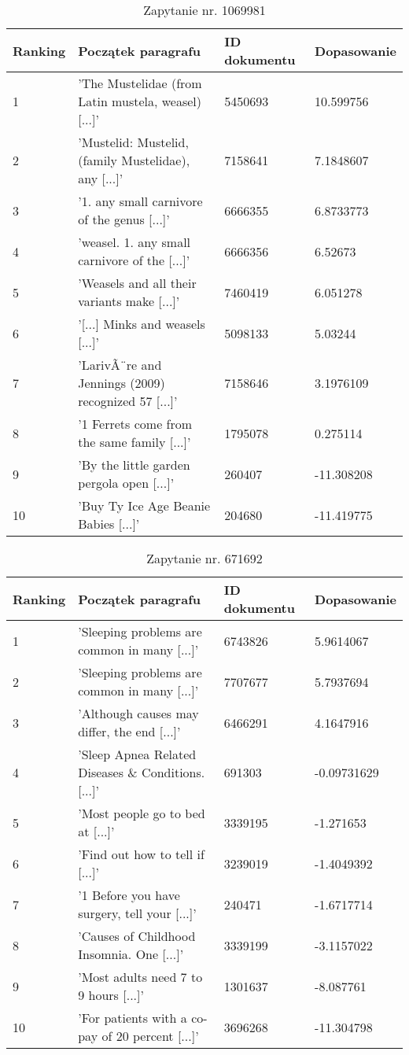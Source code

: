 \begin{table}[htp!]
\centering
\caption{Zapytanie nr. 1069981}
\vspace*{5mm}
\begin{tabular}{llll}
   Ranking & Początek paragrafu & ID dokumentu & Dopasowanie \\
   \hline
    1 & 'The Mustelidae (from Latin mustela, weasel) [...]' & 5450693 & 10.599756 \\
    2 & 'Mustelid: Mustelid, (family Mustelidae), any [...]' & 7158641 &  7.1848607 \\
    3 & '1. any small carnivore of the genus [...]' & 6666355 & 6.8733773 \\
    4 & 'weasel. 1. any small carnivore of the [...]' & 6666356 &  6.52673 \\
    5 & 'Weasels and all their variants make [...]' & 7460419 &  6.051278\\
    6 & '[...] Minks and weasels  [...]' & 5098133 & 5.03244 \\
    7 & 'LarivÃ¨re and Jennings (2009) recognized 57 [...]' & 7158646 & 3.1976109 \\
    8 & '1 Ferrets come from the same family [...]' & 1795078 &  0.275114 \\
    9 & 'By the little garden pergola open [...]' & 260407 &  -11.308208 \\
    10 & 'Buy Ty Ice Age Beanie Babies [...]' & 204680 & -11.419775 \\
\end{tabular}
\end{table}



\begin{table}[htp!]
\centering
\caption{Zapytanie nr. 671692}
\vspace*{5mm}
\begin{tabular}{llll}
   Ranking & Początek paragrafu & ID dokumentu & Dopasowanie \\
   \hline
    1 & 'Sleeping problems are common in many [...]' & 6743826 & 5.9614067 \\
    2 & 'Sleeping problems are common in many [...]' & 7707677 & 5.7937694 \\
    3 & 'Although causes may differ, the end [...]' & 6466291 & 4.1647916 \\
    4 & 'Sleep Apnea Related Diseases \& Conditions. [...]' & 691303 & -0.09731629 \\
    5 & 'Most people go to bed at [...]' & 3339195 & -1.271653 \\
    6 & 'Find out how to tell if [...]' & 3239019 & -1.4049392\\
    7 & '1 Before you have surgery, tell your [...]' & 240471 & -1.6717714  \\
    8 & 'Causes of Childhood Insomnia. One [...]' & 3339199 & -3.1157022 \\
    9 & 'Most adults need 7 to 9 hours [...]' & 1301637 & -8.087761 \\
    10 & 'For patients with a co-pay of 20 percent [...]' & 3696268 & -11.304798 \\
\end{tabular}
\end{table}

